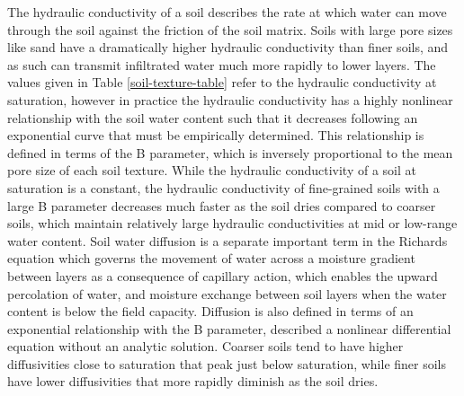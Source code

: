 The hydraulic conductivity of a soil describes the rate at which water can move through the soil against the friction of the soil matrix. Soils with large pore sizes like sand have a dramatically higher hydraulic conductivity than finer soils, and as such can transmit infiltrated water much more rapidly to lower layers. The values given in Table \ref{soil-texture-table} refer to the hydraulic conductivity at saturation, however in practice the hydraulic conductivity has a highly nonlinear relationship with the soil water content such that it decreases following an exponential curve that must be empirically determined. This relationship is defined in terms of the B parameter, which is inversely proportional to the mean pore size of each soil texture. While the hydraulic conductivity of a soil at saturation is a constant, the hydraulic conductivity of fine-grained soils with a large B parameter decreases much faster as the soil dries compared to coarser soils, which maintain relatively large hydraulic conductivities at mid or low-range water content. Soil water diffusion is a separate important term in the Richards equation which governs the movement of water across a moisture gradient between layers as a consequence of capillary action, which enables the upward percolation of water, and moisture exchange between soil layers when the water content is below the field capacity. Diffusion is also defined in terms of an exponential relationship with the B parameter, described a nonlinear differential equation without an analytic solution. Coarser soils tend to have higher diffusivities close to saturation that peak just below saturation, while finer soils have lower diffusivities that more rapidly diminish as the soil dries.

